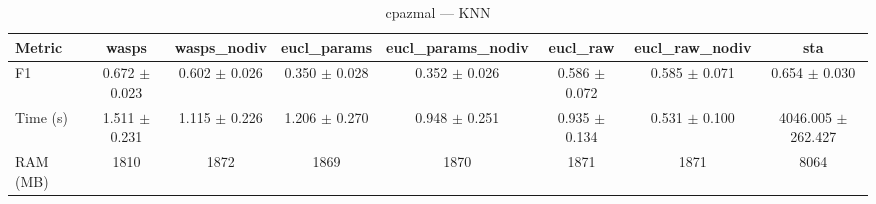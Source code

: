 \begin{table}[htbp]
\centering
\begin{NiceTabular}{lccccccc}
\toprule
Metric & wasps & wasps\_nodiv & eucl\_params & eucl\_params\_nodiv & eucl\_raw & eucl\_raw\_nodiv & sta \\
\midrule
F1 & 0.672 $\pm$ 0.023 & 0.602 $\pm$ 0.026 & 0.350 $\pm$ 0.028 & 0.352 $\pm$ 0.026 & 0.586 $\pm$ 0.072 & 0.585 $\pm$ 0.071 & 0.654 $\pm$ 0.030 \\
Time (s) & 1.511 $\pm$ 0.231 & 1.115 $\pm$ 0.226 & 1.206 $\pm$ 0.270 & 0.948 $\pm$ 0.251 & 0.935 $\pm$ 0.134 & 0.531 $\pm$ 0.100 & 4046.005 $\pm$ 262.427 \\
RAM (MB) & 1810 & 1872 & 1869 & 1870 & 1871 & 1871 & 8064 \\
\bottomrule
\end{NiceTabular}
\caption{cpazmal --- KNN}
\label{tab:exp1_cpazmal_knn}
\end{table}
